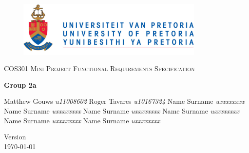 \begin{titlepage}
\begin{center}

\begin{figure}[t]
	\centering
	\includegraphics[width=350px]{UP_Logo.png}
\end{figure}

\textsc{\LARGE COS301 Mini Project Functional \newline\newline Requirements Specification}

\textbf{\newline Group 2a} \\
\begin{flushright} \large
Matthew Gouws \emph{u11008602} \newline
Roger Tavares \emph{u10167324} \newline
Name Surname \emph{uxxxxxxxx} \newline
Name Surname \emph{uxxxxxxxx} \newline
Name Surname \emph{uxxxxxxxx} \newline
Name Surname \emph{uxxxxxxxx} \newline
Name Surname \emph{uxxxxxxxx} \newline
Name Surname \emph{uxxxxxxxx} \newline
\end{flushright}

\vfill

{\large Version }
\\
{\large \today}

\end{center}
\end{titlepage}
